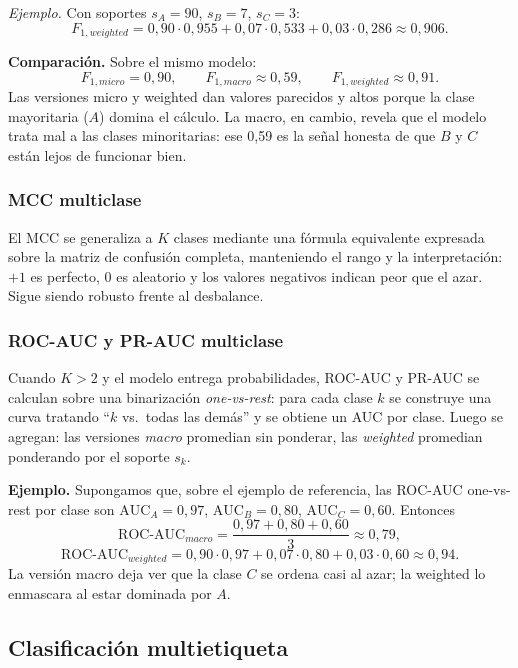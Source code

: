 \documentclass[12pt,oneside]{report}
\begin{document}
\emph{Ejemplo.} Con soportes $s_A=90$, $s_B=7$, $s_C=3$:
\[
F_{1,weighted}=0{,}90\cdot 0{,}955+0{,}07\cdot 0{,}533+0{,}03\cdot 0{,}286\approx 0{,}906.
\]

\textbf{Comparación.} Sobre el mismo modelo:
\[
F_{1,micro}=0{,}90,\qquad F_{1,macro}\approx 0{,}59,\qquad F_{1,weighted}\approx 0{,}91.
\]
Las versiones micro y weighted dan valores parecidos y altos porque la
clase mayoritaria ($A$) domina el cálculo. La macro, en cambio, revela
que el modelo trata mal a las clases minoritarias: ese 0{,}59 es la
señal honesta de que $B$ y $C$ están lejos de funcionar bien.

\subsubsection{MCC multiclase}

El MCC se generaliza a $K$ clases mediante una fórmula equivalente
expresada sobre la matriz de confusión completa, manteniendo el rango y
la interpretación: $+1$ es perfecto, $0$ es aleatorio y los valores
negativos indican peor que el azar. Sigue siendo robusto frente al
desbalance.

\subsubsection{ROC-AUC y PR-AUC multiclase}

Cuando $K>2$ y el modelo entrega probabilidades, ROC-AUC y PR-AUC se
calculan sobre una binarización \emph{one-vs-rest}: para cada clase $k$
se construye una curva tratando ``$k$ vs.\ todas las demás'' y se
obtiene un AUC por clase. Luego se agregan: las versiones \emph{macro}
promedian sin ponderar, las \emph{weighted} promedian ponderando por el
soporte $s_k$.

\textbf{Ejemplo.} Supongamos que, sobre el ejemplo de referencia, las
ROC-AUC one-vs-rest por clase son $\mathrm{AUC}_A=0{,}97$,
$\mathrm{AUC}_B=0{,}80$, $\mathrm{AUC}_C=0{,}60$. Entonces
\[
\mathrm{ROC\text{-}AUC}_{macro}=\frac{0{,}97+0{,}80+0{,}60}{3}\approx 0{,}79,
\]
\[
\mathrm{ROC\text{-}AUC}_{weighted}=0{,}90\cdot 0{,}97+0{,}07\cdot 0{,}80+0{,}03\cdot 0{,}60\approx 0{,}94.
\]
La versión macro deja ver que la clase $C$ se ordena casi al azar; la
weighted lo enmascara al estar dominada por $A$.

\subsection{Clasificación multietiqueta}
\end{document}
